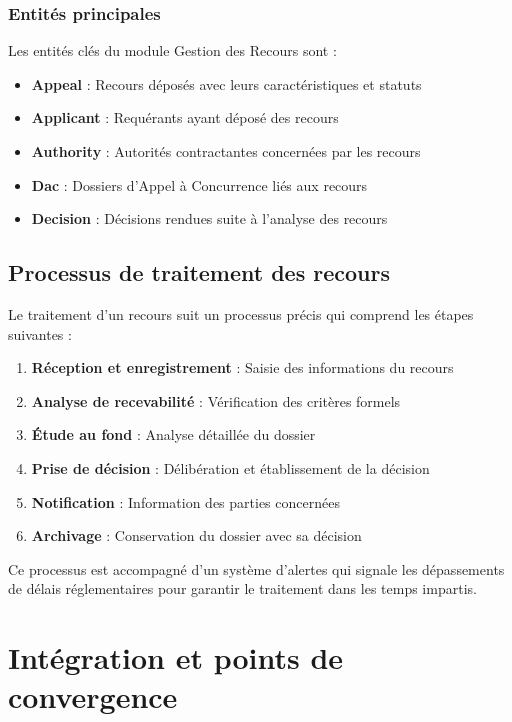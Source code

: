 \subsubsection{Entités principales}
Les entités clés du module Gestion des Recours sont :

\begin{itemize}
    \item \textbf{Appeal} : Recours déposés avec leurs caractéristiques et statuts
    \item \textbf{Applicant} : Requérants ayant déposé des recours
    \item \textbf{Authority} : Autorités contractantes concernées par les recours
    \item \textbf{Dac} : Dossiers d'Appel à Concurrence liés aux recours
    \item \textbf{Decision} : Décisions rendues suite à l'analyse des recours
\end{itemize}

\subsection{Processus de traitement des recours}
Le traitement d'un recours suit un processus précis qui comprend les étapes suivantes :

\begin{enumerate}
    \item \textbf{Réception et enregistrement} : Saisie des informations du recours
    \item \textbf{Analyse de recevabilité} : Vérification des critères formels
    \item \textbf{Étude au fond} : Analyse détaillée du dossier
    \item \textbf{Prise de décision} : Délibération et établissement de la décision
    \item \textbf{Notification} : Information des parties concernées
    \item \textbf{Archivage} : Conservation du dossier avec sa décision
\end{enumerate}

Ce processus est accompagné d'un système d'alertes qui signale les dépassements de délais réglementaires pour garantir le traitement dans les temps impartis.

\section{Intégration et points de convergence}

